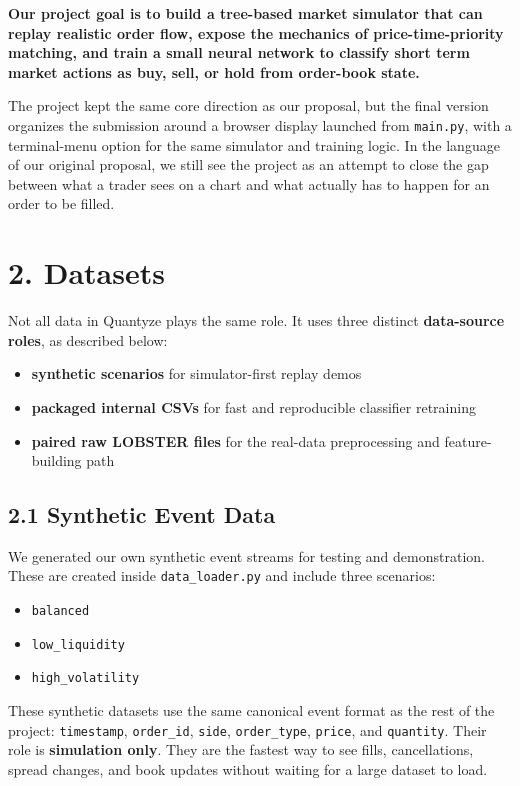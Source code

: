 \documentclass[11pt]{article}
\begin{document}
\textbf{Our project goal is to build a tree-based market simulator that can
replay realistic order flow, expose the mechanics of price-time-priority
matching, and train a small neural network to classify short term market actions
as buy, sell, or hold from order-book state.}

The project kept the same core direction as our proposal, but the final version
organizes the submission around a browser display launched from
\texttt{main.py}, with a terminal-menu option for the same simulator and
training logic. In the language of our original
proposal, we still see the project as an attempt to close the gap between what
a trader sees on a chart and what actually has to happen for an order to be
filled.

\section*{2. Datasets}
Not all data in Quantyze plays the same role. It uses three distinct
\textbf{data-source roles}, as described below:
\begin{itemize}
    \item \textbf{synthetic scenarios} for simulator-first replay demos
    \item \textbf{packaged internal CSVs} for fast and reproducible classifier
    retraining
    \item \textbf{paired raw LOBSTER files} for the real-data preprocessing and
    feature-building path
\end{itemize}

\subsection*{2.1 Synthetic Event Data}
We generated our own synthetic event streams for testing and demonstration.
These are created inside \texttt{data\_loader.py} and include three scenarios:
\begin{itemize}
    \item \texttt{balanced}
    \item \texttt{low\_liquidity}
    \item \texttt{high\_volatility}
\end{itemize}

These synthetic datasets use the same canonical event format as the rest of the
project: \texttt{timestamp}, \texttt{order\_id}, \texttt{side},
\texttt{order\_type}, \texttt{price}, and \texttt{quantity}. Their role is
\textbf{simulation only}. They are the fastest way to see fills, cancellations,
spread changes, and book updates without
waiting for a large dataset to load.
\end{document}
